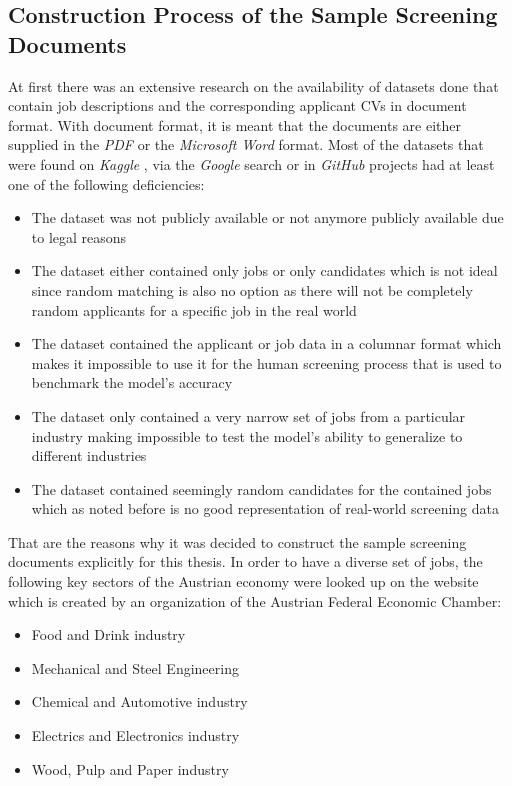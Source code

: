 \documentclass[draft,final]{thesisclass} %
\begin{document}
\subsection{Construction Process of the Sample Screening Documents}
At first there was an extensive research on the availability of datasets done that contain job descriptions and the corresponding applicant \acs{CV}s in document format. 
With document format, it is meant that the documents are either supplied in the \textit{PDF} or the \textit{Microsoft Word} format.
Most of the datasets that were found on \textit{Kaggle} \parencite{kaggle}, via the \textit{Google} search or in \textit{GitHub} projects had at least one of the following deficiencies:
\begin{itemize}
    \item The dataset was not publicly available or not anymore publicly available due to legal reasons
    \item The dataset either contained only jobs or only candidates which is not ideal since random matching is also no option as there will not be completely random applicants for a specific job in the real world
    \item The dataset contained the applicant or job data in a columnar format which makes it impossible to use it for the human screening process that is used to benchmark the model's accuracy
    \item The dataset only contained a very narrow set of jobs from a particular industry making impossible to test the model's ability to generalize to different industries
    \item The dataset contained seemingly random candidates for the contained jobs which as noted before is no good representation of real-world screening data
\end{itemize}
That are the reasons why it was decided to construct the sample screening documents explicitly for this thesis.
In order to have a diverse set of jobs, the following key sectors of the Austrian economy were looked up on the website \parencite{austria_key_sectors} which is created by an organization of the Austrian Federal Economic Chamber:
\begin{itemize}
    \item Food and Drink industry
    \item Mechanical and Steel Engineering
    \item Chemical and Automotive industry
    \item Electrics and Electronics industry
    \item Wood, Pulp and Paper industry
\end{itemize}
\end{document}
